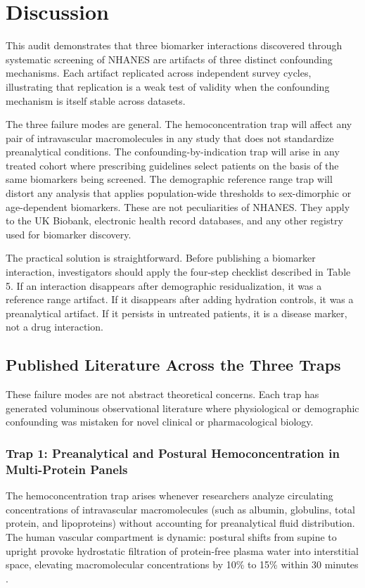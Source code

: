 \documentclass[10pt,letterpaper]{article}
\begin{document}
\section{Discussion}

This audit demonstrates that three biomarker interactions discovered through systematic screening of NHANES are artifacts of three distinct confounding mechanisms. Each artifact replicated across independent survey cycles, illustrating that replication is a weak test of validity when the confounding mechanism is itself stable across datasets.

The three failure modes are general. The hemoconcentration trap will affect any pair of intravascular macromolecules in any study that does not standardize preanalytical conditions. The confounding-by-indication trap will arise in any treated cohort where prescribing guidelines select patients on the basis of the same biomarkers being screened. The demographic reference range trap will distort any analysis that applies population-wide thresholds to sex-dimorphic or age-dependent biomarkers. These are not peculiarities of NHANES. They apply to the UK Biobank, electronic health record databases, and any other registry used for biomarker discovery.

The practical solution is straightforward. Before publishing a biomarker interaction, investigators should apply the four-step checklist described in Table 5. If an interaction disappears after demographic residualization, it was a reference range artifact. If it disappears after adding hydration controls, it was a preanalytical artifact. If it persists in untreated patients, it is a disease marker, not a drug interaction.

\subsection{Published Literature Across the Three Traps}
These failure modes are not abstract theoretical concerns. Each trap has generated voluminous observational literature where physiological or demographic confounding was mistaken for novel clinical or pharmacological biology.

\subsubsection{Trap 1: Preanalytical and Postural Hemoconcentration in Multi-Protein Panels}
The hemoconcentration trap arises whenever researchers analyze circulating concentrations of intravascular macromolecules (such as albumin, globulins, total protein, and lipoproteins) without accounting for preanalytical fluid distribution. The human vascular compartment is dynamic: postural shifts from supine to upright provoke hydrostatic filtration of protein-free plasma water into interstitial space, elevating macromolecular concentrations by 10\% to 15\% within 30 minutes \cite{tan1973, statland1974, maron1977, dixon1978}. 
\end{document}

